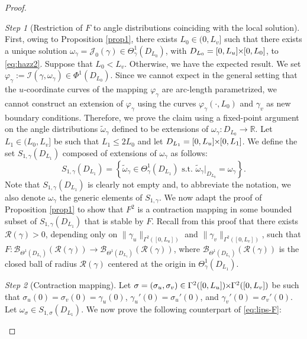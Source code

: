 \documentclass{article}
\newcommand{\I}{\mathcal{I}}
\newcommand{\RR}{\mathcal{R}}
\newcommand{\PLH}{{\mkern-1mu\times\mkern-1mu}}
\newcommand{\Times}{\PLH}
\newcommand{\R}{\mathbb{R}}
\newcommand{\J}{\mathcal{J}}
\theoremstyle{remark}
\theoremstyle{prpart}
\newtheorem{proofpart}{Step}
\newcommand{\B}{\mathcal{B}}
\begin{document}
\begin{proof}
  \begin{proofpart}[Restriction of $F$ to angle distributions coinciding with the local solution]
    First, owing to Proposition \ref{prop1}, there exists $L_0\in(0,L_v]$ such that there exists a unique solution $\omega_\gamma = \J_0(\gamma)\in \Theta_{\gamma}^{1}(D_{L_0})$, with $D_{L_0} = [0,L_u]\Times[0,L_0]$, to \eqref{eq:hazz2}. Suppose that $L_0<L_v$. Otherwise, we have the expected result. We set $\varphi_\gamma:=\I(\gamma,\omega_\gamma)\in\Phi^{1}(D_{L_0})$. Since we cannot expect in the general setting that the $u$-coordinate curves of the mapping $\varphi_\gamma$ are arc-length parametrized, we cannot construct an extension of $\varphi_\gamma$ using the curves $\varphi_\gamma(\cdot,L_0)$ and $\gamma_v$ as new boundary conditions. Therefore, we prove the claim using a fixed-point argument on the angle distributions $\tilde\omega_\gamma$ defined to be extensions of $\omega_\gamma:D_{L_0}\to\R$. %
    Let $L_1\in(L_0,L_v]$ be such that $L_1\leq 2L_0$ and let $D_{L_1}=[0,L_u]\Times[0,L_1]$. We define the set  $S_{1,\gamma}(D_{L_1})$ composed of extensions of $\omega_\gamma$ as follows:
    \begin{equation*}
      S_{1,\gamma}(D_{L_1}) = \left\{\tilde \omega_\gamma\in\Theta^{1}_\gamma(D_{L_1}) \text{ s.t. } \tilde \omega_\gamma\big|_{D_{L_0}} = \omega_\gamma\right\}.
    \end{equation*}
    Note that $S_{1,\gamma}(D_{L_1})$ is clearly not empty and, to abbreviate the notation, we also denote $\omega_\gamma$ the generic elements of $S_{1,\gamma}$. We now adapt the proof of Proposition \ref{prop1} to show that $F^2$ is a contraction mapping in some bounded subset of $S_{1,\gamma}(D_{L_1})$ that is stable by $F$. Recall from this proof that there exists $\RR(\gamma)>0$, depending only on $\|\gamma_u\|_{\Gamma^{2}([0,L_u])}$ and $\|\gamma_v\|_{\Gamma^{2}([0,L_v])}$, such that $F:\B_{\Theta^{1}(D_{L_1})}(\RR(\gamma)) \to \B_{\Theta^{1}(D_{L_1})}(\RR(\gamma))$, where $\B_{\Theta^{1}(D_{L_1})}(\RR(\gamma))$ is the closed ball of radius $\RR(\gamma)$ centered at the origin in $\Theta^{1}_{\gamma}(D_{L_1})$. 
  \end{proofpart}
  \begin{proofpart}[Contraction mapping]
    Let $\sigma=(\sigma_u,\sigma_v) \in \Gamma^{2}([0,L_u])\Times\Gamma^{2}([0,L_v])$ be such that $\sigma_u(0)=\sigma_v(0)=\gamma_u(0)$, $\gamma_u'(0)=\sigma_u'(0)$, and $\gamma_v'(0)=\sigma_v'(0)$. Let $\omega_\sigma\in S_{1,\sigma}(D_{L_1})$. We now prove the following counterpart of \eqref{eq:lips-F}:

\end{proofpart}
\end{proof}
\end{document}
